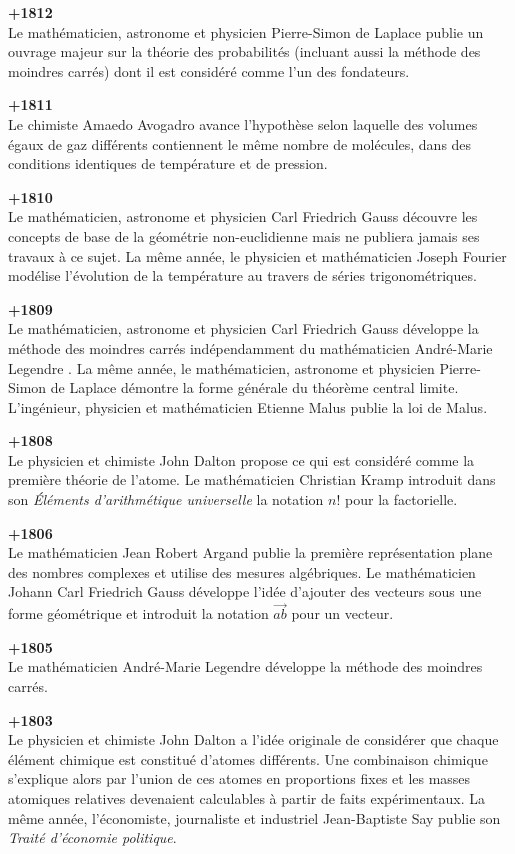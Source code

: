 \textbf{+1812}\\
Le mathématicien, astronome et physicien Pierre-Simon de Laplace publie un ouvrage majeur sur la théorie des probabilités (incluant aussi la méthode des moindres carrés) dont il est considéré comme l'un des fondateurs.

\textbf{+1811}\\
Le chimiste Amaedo Avogadro avance l'hypothèse selon laquelle des volumes égaux de gaz différents contiennent le même nombre de molécules, dans des conditions identiques de température et de pression.

\textbf{+1810}\\
Le mathématicien, astronome et physicien Carl Friedrich Gauss découvre les concepts de base de la géométrie non-euclidienne mais ne publiera jamais ses travaux à ce sujet. La même année, le physicien et mathématicien Joseph Fourier modélise l'évolution de la température au travers de séries trigonométriques.

\textbf{+1809}\\
Le mathématicien, astronome et physicien Carl Friedrich Gauss développe la méthode des moindres carrés indépendamment du mathématicien André-Marie Legendre . La même année, le mathématicien, astronome et physicien Pierre-Simon de Laplace démontre la forme générale du théorème central limite. L'ingénieur, physicien et mathématicien Etienne Malus publie la loi de Malus.

\textbf{+1808}\\
Le physicien et chimiste John Dalton propose ce qui est considéré comme la première théorie de l'atome. Le mathématicien Christian Kramp introduit dans son \textit{Éléments d'arithmétique universelle} la notation $n!$ pour la factorielle.

\textbf{+1806}\\
Le mathématicien Jean Robert Argand publie la première représentation plane des nombres complexes et utilise des mesures algébriques. Le mathématicien Johann Carl Friedrich Gauss développe l'idée d'ajouter des vecteurs sous une forme géométrique et introduit la notation $\overrightarrow{ab}$ pour un vecteur.

\textbf{+1805}\\
Le mathématicien André-Marie Legendre développe la méthode des moindres carrés.

\textbf{+1803}\\
Le physicien et chimiste John Dalton a l'idée originale de considérer que chaque élément chimique est constitué d'atomes différents. Une combinaison chimique s'explique alors par l'union de ces atomes en proportions fixes et les masses atomiques relatives devenaient calculables à partir de faits expérimentaux. La même année, l'économiste, journaliste et industriel Jean-Baptiste Say publie son \textit{Traité d'économie politique}.

